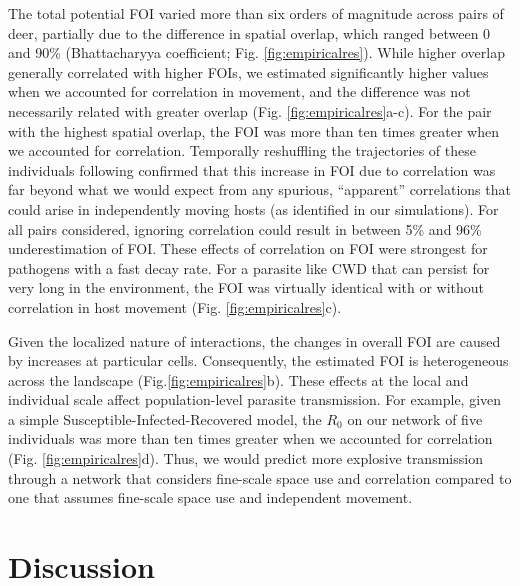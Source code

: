 \documentclass[letterpaper]{article}
\begin{document}
The total potential FOI varied more than six orders of magnitude across pairs of deer, partially due to the difference in spatial overlap, which ranged between 0 and 90\% (Bhattacharyya coefficient; Fig. \ref{fig:empiricalres}). While higher overlap generally correlated with higher FOIs, we estimated significantly higher values when we accounted for correlation in movement, and the difference was not necessarily related with greater overlap (Fig. \ref{fig:empiricalres}a-c).  For the pair with the highest spatial overlap, the FOI was more than ten times greater when we accounted for correlation. Temporally reshuffling the trajectories of these individuals following \cite{Spiegel2016} confirmed that this increase in FOI due to correlation was far beyond what we would expect from any  spurious, ``apparent'' correlations that could arise in independently moving hosts (as identified in our simulations). For all pairs considered, ignoring correlation could result in between 5\% and 96\% underestimation of FOI. These effects of correlation on FOI were strongest for pathogens with a fast decay rate. For a parasite like CWD that can persist for very long in the environment, the FOI was virtually identical with or without correlation in host movement (Fig. \ref{fig:empiricalres}c). 

Given the localized nature of interactions, the changes in overall FOI are caused by increases at particular cells. Consequently, the estimated FOI is heterogeneous across the landscape (Fig.\ref{fig:empiricalres}b). These effects at the local and individual scale affect population-level parasite transmission. For example, given a simple Susceptible-Infected-Recovered model, the $R_0$ on our network of five individuals was more than ten times greater when we accounted for correlation (Fig. \ref{fig:empiricalres}d). Thus, we would predict more explosive transmission through a network that considers fine-scale space use and correlation compared to one that assumes fine-scale space use and independent movement.

\section*{Discussion}
\end{document}
